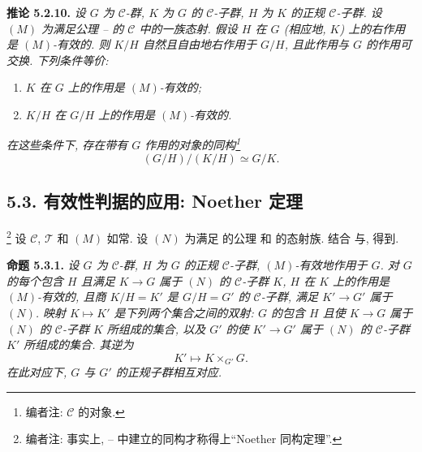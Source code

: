 \medskip
\noindent{}\textbf{推论 5.2.10.}
\textit{设 \(G\) 为 \(\mathscr C\)-群, \(K\) 为 \(G\) 的
\(\mathscr C\)-子群, \(H\) 为 \(K\) 的正规 \(\mathscr C\)-子群.
设 \((M)\) 为满足公理
--
的 \(\mathscr C\) 中的一族态射.
假设 \(H\) 在 \(G\) (相应地, \(K\)) 上的右作用是 \((M)\)-有效的.
则 \(K/H\) 自然且自由地右作用于 \(G/H\), 且此作用与 \(G\) 的作用可交换.
下列条件等价:}
\begin{enumerate}
  \item[(i)] \textit{\(K\) 在 \(G\) 上的作用是 \((M)\)-有效的;}
  \item[(ii)] \textit{\(K/H\) 在 \(G/H\) 上的作用是 \((M)\)-有效的.}
\end{enumerate}
\textit{在这些条件下, 存在带有 \(G\) 作用的对象的同构\footnote{编者注: \(\mathscr C\) 的对象.} }
\[
  (G/H)/(K/H)\simeq G/K.
\]

\subsection*{5.3. 有效性判据的应用: Noether 定理}
\footnote{编者注: 事实上, --
中建立的同构才称得上``Noether 同构定理''.}
设 \(\mathscr C\), \(\mathcal T\) 和 \((M)\) 如常.
设 \((N)\) 为满足 的公理
 和 的态射族.
结合 与,
得到.

\medskip
\noindent{}\textbf{命题 5.3.1.}
\textit{设 \(G\) 为 \(\mathscr C\)-群,
\(H\) 为 \(G\) 的正规 \(\mathscr C\)-子群, \((M)\)-有效地作用于 \(G\).
对 \(G\) 的每个包含 \(H\) 且满足 \(K\to G\) 属于 \((N)\) 的
\(\mathscr C\)-子群 \(K\), \(H\) 在 \(K\) 上的作用是 \((M)\)-有效的,
且商 \(K/H=K'\) 是 \(G/H=G'\) 的 \(\mathscr C\)-子群,
满足 \(K'\to G'\) 属于 \((N)\).
映射 \(K\mapsto K'\) 是下列两个集合之间的双射:
\(G\) 的包含 \(H\) 且使 \(K\to G\) 属于 \((N)\) 的
\(\mathscr C\)-子群 \(K\) 所组成的集合,
以及 \(G'\) 的使 \(K'\to G'\) 属于 \((N)\) 的
\(\mathscr C\)-子群 \(K'\) 所组成的集合. 其逆为}
\[
  K'\longmapsto K\times_{G'}G.
\]
\textit{在此对应下, \(G\) 与 \(G'\) 的正规子群相互对应.}


